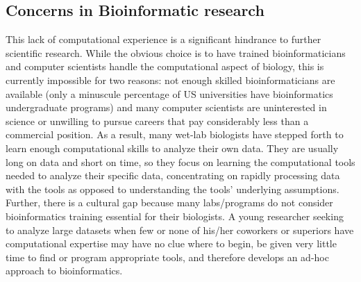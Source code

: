 \documentclass[ChapterTOCs,krantz2]{krantz} %
\begin{document}
\subsection{Concerns in Bioinformatic research}

This lack of computational experience is a significant hindrance to further
scientific research.  While the obvious choice is
to have trained bioinformaticians and computer scientists handle the
computational aspect of biology, this is currently impossible for two reasons:
not enough skilled bioinformaticians are available (only a minuscule percentage
of US universities have bioinformatics undergraduate programs) and many
computer scientists are uninterested in science or unwilling to pursue careers
that pay considerably less than a commercial position.  As a result, many
wet-lab biologists have stepped forth to learn enough 
computational skills to analyze their own data.  
They are usually long on data and short on time, so they
focus on learning the computational tools needed to analyze their specific
data, concentrating on rapidly processing data with the tools 
as opposed to understanding the tools' underlying
assumptions.  Further, there is a cultural gap
because many labs/programs do not consider bioinformatics training 
essential for their biologists.  A young researcher seeking to analyze large datasets 
when few or none of his/her coworkers or superiors have
computational expertise may have no clue where to begin, be given very little
time to find or program appropriate tools, and therefore develops an ad-hoc
approach to bioinformatics.    
\end{document}
